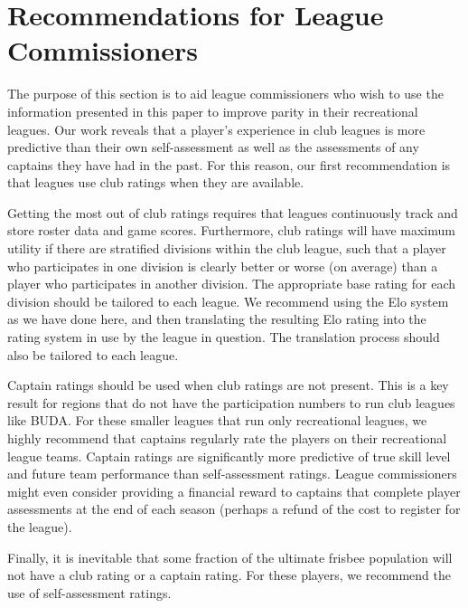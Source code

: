 \section{Recommendations for League Commissioners}\label{sec:recommendations}

The purpose of this section is to aid league commissioners who wish to use the information presented in this paper to improve parity in their recreational leagues. Our work reveals that a player's experience in club leagues is more predictive than their own self-assessment as well as the assessments of any captains they have had in the past. For this reason, our first recommendation is that leagues use club ratings when they are available. 

Getting the most out of club ratings requires that leagues continuously track and store roster data and game scores. Furthermore, club ratings will have maximum utility if there are stratified divisions within the club league, such that a player who participates in one division is clearly better or worse (on average) than a player who participates in another division. The appropriate base rating for each division should be tailored to each league. We recommend using the Elo system as we have done here, and then translating the resulting Elo rating into the rating system in use by the league in question. The translation process should also be tailored to each league.

Captain ratings should be used when club ratings are not present. This is a key result for regions that do not have the participation numbers to run club leagues like BUDA. For these smaller leagues that run only recreational leagues, we highly recommend that captains regularly rate the players on their recreational league teams. Captain ratings are significantly more predictive of true skill level and future team performance than self-assessment ratings. League commissioners might even consider providing a financial reward to captains that complete player assessments at the end of each season (perhaps a refund of the cost to register for the league).

Finally, it is inevitable that some fraction of the ultimate frisbee population will not have a club rating or a captain rating. For these players, we recommend the use of self-assessment ratings.